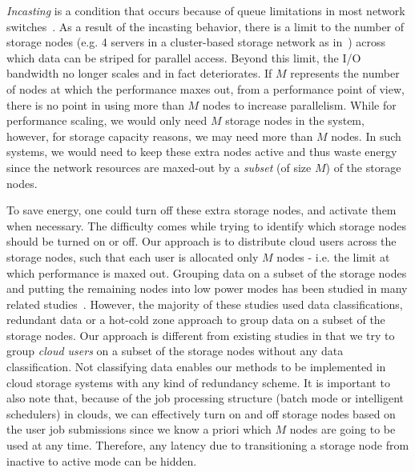 \textit{Incasting} is a condition that occurs because of queue limitations in most network
switches~\cite{Nagle:2004:PAS:1048933.1049998}. As a result of the incasting behavior, there
is a limit to the number of storage nodes (e.g. 4 servers in a cluster-based storage network
as in~\cite{Krevat:2007:AAA:1374596.1374598}) across which data can be
striped for parallel access. Beyond this limit,
the I/O bandwidth no longer scales and in fact deteriorates. If $M$ represents the number of nodes at
which the performance maxes out, from a performance point of view, there is no point in using more
than $M$ nodes to increase parallelism. While for performance scaling, we would only need $M$ storage nodes in the system,
however, for storage capacity reasons, we may need more than $M$ nodes. In such systems, we would
need to keep these extra nodes active and thus waste energy since the network resources are maxed-out
by a \textit{subset} (of size $M$) of the storage nodes.

To save energy, one could turn off these extra storage nodes, and activate them when necessary. The
difficulty comes while trying to identify which storage nodes should be turned on or off. Our approach
is to distribute cloud users across the storage nodes, such that each user is allocated only $M$
nodes - i.e. the limit at which performance is maxed out. Grouping data on a subset of the storage nodes
and putting the remaining nodes into low power modes has been studied in many related
studies~\cite{Kaushik:2010:GTE:1924920.1924927, Kaushik:2010:LSE:1851476.1851523, Leverich:2010:EEH:1740390.1740405}.
However, the majority of these studies used data classifications,
redundant data or a hot-cold zone approach
to group data on a subset of the storage nodes. Our approach is different from existing studies in that
we try to group \textit{cloud users} on a subset of the storage nodes without any data classification. Not
classifying data enables our methods to be implemented in cloud storage systems with any kind of
redundancy scheme. It is important to also note that, because of the job processing structure (batch mode or
intelligent schedulers) in clouds, we can effectively turn on and off storage nodes based on the user job
submissions since we know a priori which $M$ nodes are going to be used at any time. Therefore, any latency
due to transitioning a storage node from inactive to active mode can be hidden. 

